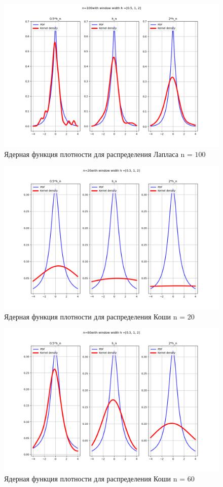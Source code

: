 \documentclass[a4]{article}
\begin{document}
\begin{center}
\begin{figure}[H]
	\caption{Ядерная функция плотности для распределения Лапласа n = $100$ }
	\includegraphics[width=\textwidth]{laplace_pdf_100.png} 
\end{figure}

\begin{figure}[H]
\caption{Ядерная функция плотности для распределения Коши n = $20$ }
\includegraphics[width=\textwidth]{cauchy_pdf_20.png} 
\end{figure}

\begin{figure}[H]
	\caption{Ядерная функция плотности для распределения Коши n = $60$ }
	\includegraphics[width=\textwidth]{cauchy_pdf_60.png} 
\end{figure}


\end{center}
\end{document}
